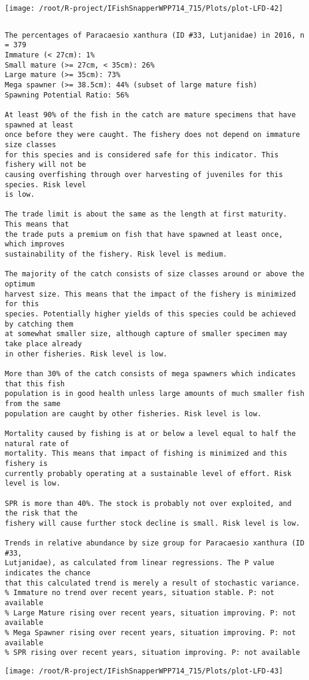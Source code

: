 \documentclass{report}\usepackage[]{graphicx}\usepackage[]{color}
\makeatletter
\def\maxwidth{ %
  \ifdim\Gin@nat@width>\linewidth
    \linewidth
  \else
    \Gin@nat@width
  \fi
}
\newenvironment{kframe}{%
 \def\at@end@of@kframe{}%
 \ifinner\ifhmode%
  \def\at@end@of@kframe{\end{minipage}}%
  \begin{minipage}{\columnwidth}%
 \fi\fi%
 \def\FrameCommand##1{\hskip\@totalleftmargin \hskip-\fboxsep
 \colorbox{shadecolor}{##1}\hskip-\fboxsep
     \hskip-\linewidth \hskip-\@totalleftmargin \hskip\columnwidth}%
 \MakeFramed {\advance\hsize-\width
   \@totalleftmargin\z@ \linewidth\hsize
   \@setminipage}}%
 {\par\unskip\endMakeFramed%
 \at@end@of@kframe}
\newenvironment{knitrout}{}{} %
\makeatother
\begin{document}
\begin{knitrout}
\texttt{[image: /root/R-project/IFishSnapperWPP714\_715/Plots/plot-LFD-42]} 
\begin{kframe}\begin{verbatim}
\end{verbatim}
\end{kframe}
\clearpage
\newpage
\begin{kframe}\begin{verbatim}The percentages of Paracaesio xanthura (ID #33, Lutjanidae) in 2016, n = 379
Immature (< 27cm): 1%
Small mature (>= 27cm, < 35cm): 26%
Large mature (>= 35cm): 73%
Mega spawner (>= 38.5cm): 44% (subset of large mature fish)
Spawning Potential Ratio: 56%
 
At least 90% of the fish in the catch are mature specimens that have spawned at least
once before they were caught. The fishery does not depend on immature size classes
for this species and is considered safe for this indicator. This fishery will not be
causing overfishing through over harvesting of juveniles for this species. Risk level
is low.

The trade limit is about the same as the length at first maturity.  This means that
the trade puts a premium on fish that have spawned at least once, which improves
sustainability of the fishery. Risk level is medium.

The majority of the catch consists of size classes around or above the optimum
harvest size. This means that the impact of the fishery is minimized for this
species. Potentially higher yields of this species could be achieved by catching them
at somewhat smaller size, although capture of smaller specimen may take place already
in other fisheries. Risk level is low.

More than 30% of the catch consists of mega spawners which indicates that this fish
population is in good health unless large amounts of much smaller fish from the same
population are caught by other fisheries. Risk level is low.
 
Mortality caused by fishing is at or below a level equal to half the natural rate of
mortality. This means that impact of fishing is minimized and this fishery is
currently probably operating at a sustainable level of effort. Risk level is low.
 
SPR is more than 40%. The stock is probably not over exploited, and the risk that the
fishery will cause further stock decline is small. Risk level is low.
 
Trends in relative abundance by size group for Paracaesio xanthura (ID #33,
Lutjanidae), as calculated from linear regressions. The P value indicates the chance
that this calculated trend is merely a result of stochastic variance.
% Immature no trend over recent years, situation stable. P: not available
% Large Mature rising over recent years, situation improving. P: not available
% Mega Spawner rising over recent years, situation improving. P: not available
% SPR rising over recent years, situation improving. P: not available
\end{verbatim}
\end{kframe}
\texttt{[image: /root/R-project/IFishSnapperWPP714\_715/Plots/plot-LFD-43]} 


\end{knitrout}
\end{document}
